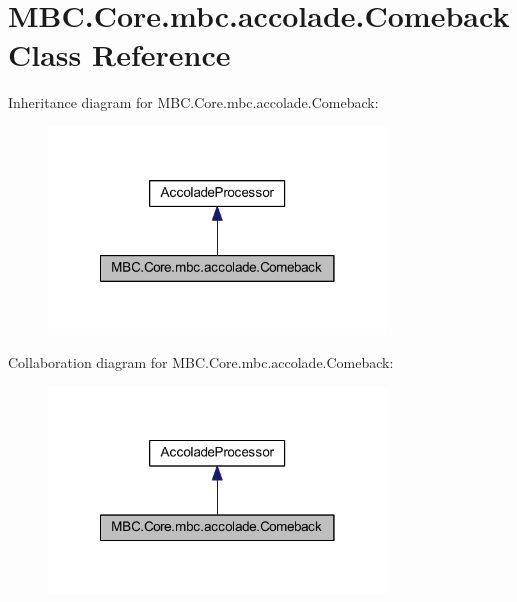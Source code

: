 \hypertarget{class_m_b_c_1_1_core_1_1mbc_1_1accolade_1_1_comeback}{\section{M\-B\-C.\-Core.\-mbc.\-accolade.\-Comeback Class Reference}
\label{class_m_b_c_1_1_core_1_1mbc_1_1accolade_1_1_comeback}
}


Inheritance diagram for M\-B\-C.\-Core.\-mbc.\-accolade.\-Comeback\-:\nopagebreak
\begin{figure}[H]
\begin{center}
\leavevmode
\includegraphics[width=254pt]{class_m_b_c_1_1_core_1_1mbc_1_1accolade_1_1_comeback__inherit__graph}
\end{center}
\end{figure}


Collaboration diagram for M\-B\-C.\-Core.\-mbc.\-accolade.\-Comeback\-:\nopagebreak
\begin{figure}[H]
\begin{center}
\leavevmode
\includegraphics[width=254pt]{class_m_b_c_1_1_core_1_1mbc_1_1accolade_1_1_comeback__coll__graph}
\end{center}
\end{figure}
